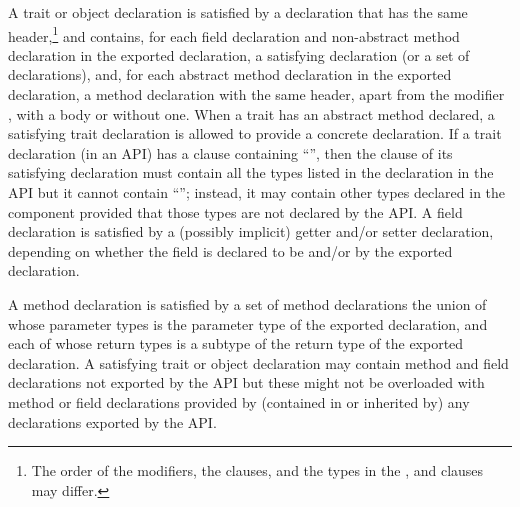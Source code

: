 A trait or object declaration is satisfied by
a declaration
that has the same header,\footnote{The order of
the modifiers,
the clauses,
and the types in the
,  and  clauses
may differ.}
and contains,
for each field declaration and non-abstract method declaration
in the exported declaration,
a satisfying declaration (or a set of declarations),
and, for each abstract method declaration in the exported declaration,
a method declaration with the same header,
apart from the modifier ,
with a body or without one.
When a trait has an abstract method declared,
a satisfying trait declaration is allowed to provide a concrete declaration.
If a trait declaration (in an API)
has a  clause containing ``\EXP{\ldots}'',
then the  clause of its satisfying declaration
must contain all the types listed in the declaration in the API
but it cannot contain ``\EXP{\ldots}'';
instead, it may contain other types declared in the component
provided that those types are not declared by the API.
A field declaration is satisfied by
a (possibly implicit) getter and/or setter declaration,
depending on whether the field
is declared to be  and/or 
by the exported declaration.

A method declaration is satisfied
by a set of method declarations
the union of whose parameter types
is the parameter type of the exported declaration,
and each of whose return types
is a subtype of the return type of the exported declaration.
A satisfying trait or object declaration
may contain method and field declarations not exported by the API
but these might not be overloaded
with method or field declarations provided by
(contained in or inherited by)
any declarations exported by the API.

